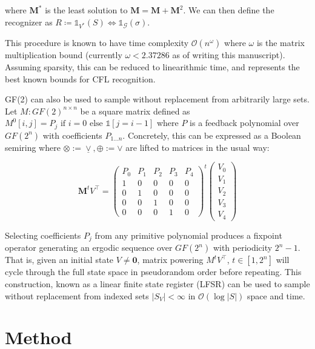 \documentclass[sigplan,10pt,review,anonymous]{acmart}
\begin{document}
where $\mathbf{M}^*$ is the least solution to $\mathbf{M} = \mathbf{M} + \mathbf{M}^2$. We can then define the recognizer as $R \coloneqq \mathds{1}_{V^*}(S) \iff \mathds{1}_\mathcal{G}(\sigma)$.

This procedure is known to have time complexity $\mathcal{O}(n^\omega)$ where $\omega$ is the matrix multiplication bound (currently $\omega < 2.37286$ as of writing this manuscript). Assuming sparsity, this can be reduced to linearithmic time, and represents the best known bounds for CFL recognition.

GF(2) can also be used to sample without replacement from arbitrarily large sets. Let $M: GF(2)^{n\times n}$ be a square matrix defined as $M^0[i, j] = P_j \text{ if } i=0 \text{ else } \mathds{1}[j = i - 1]$ where $P$ is a feedback polynomial over $GF(2^n)$ with coefficients $P_{1\ldots n}$. Concretely, this can be expressed as a Boolean semiring where $\otimes := \underline{\vee}, \oplus := \vee$ are lifted to matrices in the usual way:

\[
\mathbf{M}^tV^\intercal = \begin{pmatrix}
  P_0 & P_1 & P_2 & P_3 & P_4 \\
  1 & 0 & 0 & 0 & 0 \\
  0 & 1 & 0 & 0 & 0 \\
  0 & 0 & 1 & 0 & 0 \\
  0 & 0 & 0 & 1 & 0
\end{pmatrix}^t
\begin{pmatrix}
      V_0 \\
      V_1 \\
      V_2 \\
      V_3 \\
      V_4
\end{pmatrix}
\]

Selecting coefficients $P_j$ from any primitive polynomial produces a fixpoint operator generating an ergodic sequence over $GF(2^n)$ with periodicity $2^n - 1$. That is, given an initial state $V \neq \mathbf{0}$, matrix powering $M^{t}V^\intercal$, $t\in [1, 2^n]$ will cycle through the full state space in pseudorandom order before repeating. This construction, known as a linear finite state register (LFSR) can be used to sample without replacement from indexed sets $|S_V|<\infty$ in $\mathcal{O}(\log |S|)$ space and time.

\section{Method}
\end{document}
